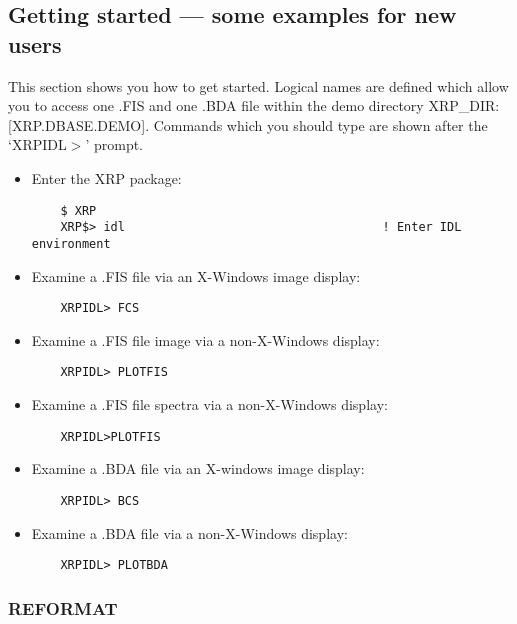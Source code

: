 \subsection{Getting started --- some examples for new users}

This section shows you how to get started.
Logical names are defined which allow you to access one .FIS and one .BDA file
within the demo directory XRP\_DIR:[XRP.DBASE.DEMO].
Commands which you should type are shown after the `XRPIDL$>$' prompt.
\begin{itemize}
\item Enter the XRP package:
\begin{verbatim}
    $ XRP
    XRP$> idl                                    ! Enter IDL environment
\end{verbatim}
\item Examine a .FIS file via an X-Windows image display:
\begin{verbatim}
    XRPIDL> FCS                             
\end{verbatim}
\item Examine a .FIS file image via a non-X-Windows display:
\begin{verbatim}
    XRPIDL> PLOTFIS                        
\end{verbatim}
\item Examine a .FIS file spectra via a non-X-Windows display:
\begin{verbatim}
    XRPIDL>PLOTFIS
\end{verbatim}
\item Examine a .BDA file via an X-windows image display:
\begin{verbatim}
    XRPIDL> BCS                             
\end{verbatim}
\item Examine a .BDA file via a non-X-Windows display:
\begin{verbatim}
    XRPIDL> PLOTBDA
\end{verbatim}
\end{itemize}                                       

\subsubsection{REFORMAT}

